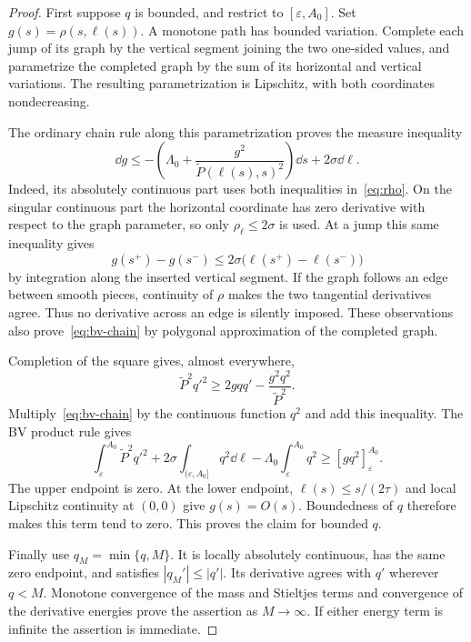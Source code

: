 \begin{proof}
First suppose $q$ is bounded, and restrict to $[\varepsilon,A_0]$. Set $g(s)=\rho(s,\ell(s))$. A monotone path has bounded variation. Complete each jump of its graph by the vertical segment joining the two one-sided values, and parametrize the completed graph by the sum of its horizontal and vertical variations. The resulting parametrization is Lipschitz, with both coordinates nondecreasing.

The ordinary chain rule along this parametrization proves the measure inequality
\begin{equation}\label{eq:bv-chain}
 \dd g\le-\left(\Lambda_0+
 \frac{g^2}{\widetilde P(\ell(s),s)^2}\right)\dd s+2\sigma\dd\ell.
\end{equation}
Indeed, its absolutely continuous part uses both inequalities in~\eqref{eq:rho}. On the singular continuous part the horizontal coordinate has zero derivative with respect to the graph parameter, so only $\rho_\ell\le2\sigma$ is used. At a jump this same inequality gives
\[
 g(s^+)-g(s^-)\le2\sigma\bigl(\ell(s^+)-\ell(s^-)\bigr)
\]
by integration along the inserted vertical segment. If the graph follows an edge between smooth pieces, continuity of $\rho$ makes the two tangential derivatives agree. Thus no derivative across an edge is silently imposed. These observations also prove~\eqref{eq:bv-chain} by polygonal approximation of the completed graph.

Completion of the square gives, almost everywhere,
\[
 \widetilde P^2q'^2\ge2gqq'-\frac{g^2q^2}{\widetilde P^2}.
\]
Multiply~\eqref{eq:bv-chain} by the continuous function $q^2$ and add this inequality. The BV product rule gives
\[
 \int_\varepsilon^{A_0}\widetilde P^2q'^2
 +2\sigma\int_{(\varepsilon,A_0]}q^2\dd\ell
 -\Lambda_0\int_\varepsilon^{A_0}q^2
 \ge [gq^2]_\varepsilon^{A_0}.
\]
The upper endpoint is zero. At the lower endpoint, $\ell(s)\le s/(2\tau)$ and local Lipschitz continuity at $(0,0)$ give $g(s)=O(s)$. Boundedness of $q$ therefore makes this term tend to zero. This proves the claim for bounded $q$.

Finally use $q_M=\min\{q,M\}$. It is locally absolutely continuous, has the same zero endpoint, and satisfies $|q_M'|\le|q'|$. Its derivative agrees with $q'$ wherever $q<M$. Monotone convergence of the mass and Stieltjes terms and convergence of the derivative energies prove the assertion as $M\to\infty$. If either energy term is infinite the assertion is immediate.
\end{proof}

